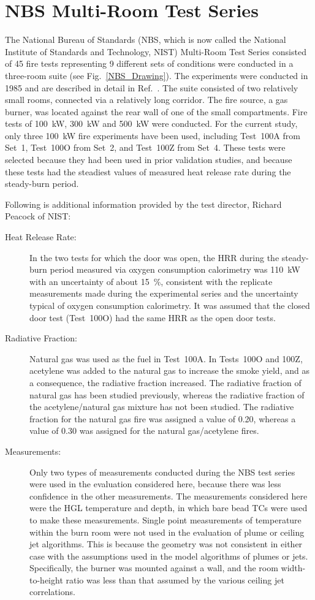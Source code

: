 \section{NBS Multi-Room Test Series}

The National Bureau of Standards (NBS, which is now called the National Institute of Standards
and Technology, NIST) Multi-Room Test Series consisted of 45 fire tests representing
9 different sets of conditions were conducted in a three-room suite (see Fig.~\ref{NBS_Drawing}). The experiments were
conducted in 1985 and are described in detail in Ref.~\cite{Peacock:NBS_Multi-Room}. The suite consisted of two relatively
small rooms, connected via a relatively long corridor. The fire source, a gas burner, was located
against the rear wall of one of the small compartments.
Fire tests of 100~kW, 300~kW and 500~kW were conducted. For the current study, only three 100~kW fire experiments have been used,
including Test~100A from Set~1, Test~100O from Set~2, and Test~100Z from Set~4. These tests
were selected because they had been used in prior validation studies, and because these tests had the
steadiest values of measured heat release rate during the steady-burn period.

Following is additional information provided by the test director, Richard Peacock of NIST:
\begin{description}
\item[Heat Release Rate:] In the two tests for which
the door was open, the HRR during the steady-burn period measured via oxygen consumption
calorimetry was 110~kW with an uncertainty of about 15~\%, consistent with the replicate
measurements made during the experimental series and the uncertainty typical of oxygen
consumption calorimetry. It was assumed that the closed door test (Test~100O) had the same HRR as the open
door tests.
\item[Radiative Fraction:] Natural gas was used as the fuel in
Test~100A. In Tests~100O and 100Z, acetylene was added to the natural gas to increase the
smoke yield, and as a consequence, the radiative fraction increased. The radiative fraction of
natural gas has been studied previously, whereas the radiative fraction of the acetylene/natural
gas mixture has not been studied. The radiative fraction for the natural gas fire was assigned a
value of 0.20, whereas a value of 0.30 was assigned for the natural gas/acetylene fires.
\item[Measurements:] Only two types of measurements conducted during the NBS test series were used in the
evaluation considered here, because there was less confidence in the other measurements.
The measurements considered here were the HGL temperature and depth, in which bare bead
TCs were used to make these measurements. Single point measurements of temperature within
the burn room were not used in the evaluation of plume or ceiling jet algorithms. This is because
the geometry was not consistent in either case with the assumptions used in the model algorithms
of plumes or jets. Specifically, the burner was mounted against a wall, and the room width-to-height
ratio was less than that assumed by the various ceiling jet correlations.
\end{description}


